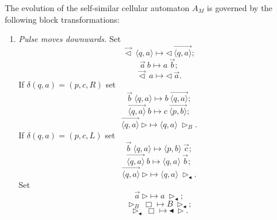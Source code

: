 \documentclass[pre,showpacs,showkeys,preprint]{revtex4}
\theoremstyle{definition}
\begin{document}
The evolution of the self-similar cellular automaton $A_M$ is governed by the following block transformations:
\begin{enumerate}

\item
\emph{Pulse moves downwards.}
Set
\begin{equation}
\overrightarrow{\lhd} \: \langle q, a \rangle \mapsto \lhd \:
\overrightarrow{\langle q, a \rangle};
\label{tr:start-state}
\end{equation}
\begin{equation}
\overrightarrow{a} \: b \mapsto a \: \overrightarrow{b};
\label{tr:down}
\end{equation}
\begin{equation}
\overrightarrow{\lhd} \:a \mapsto \lhd \: \overrightarrow{a}.
\label{tr:start}
\end{equation}
If $\delta(q,a) = (p,c,R)$ set
\begin{equation}
\overrightarrow{b} \: \langle q, a \rangle \mapsto b \:
\overrightarrow{\langle q, a \rangle};
\label{tr:down-to-head}
\end{equation}
\begin{equation}
\overrightarrow{\langle q,a \rangle} \: b \mapsto c \:
\overrightarrow{\langle p, b \rangle};
\label{tr:right-2}
\end{equation}
\begin{equation}
\overrightarrow{\langle q,a \rangle} \: \rhd \mapsto \langle q,a \rangle \:
\rhd_B.
\label{tr:down-state-right-delimiter-blank}
\end{equation}
If $\delta(q,a) = (p,c,L)$ set
\begin{equation}
\overrightarrow{b} \: \langle q, a \rangle \mapsto \langle p, b \rangle \:
\overrightarrow{c};
\label{tr:left-1}
\end{equation}
\begin{equation}
\overrightarrow{\langle q,a \rangle} \: b \mapsto \langle q,a \rangle \:
\overrightarrow{b};
\label{tr:left-no-move}
\end{equation}
\begin{equation}
\overrightarrow{\langle q,a \rangle} \: \rhd \mapsto \langle q,a \rangle \:
\rhd_\blacktriangleleft.
\label{tr:down-state-right-delimiter}
\end{equation}
Set
\begin{equation}
\overrightarrow{a} \: \rhd \mapsto a \: \rhd_\blacktriangleleft;
\label{tr:down-a-rhd}
\end{equation}
\begin{equation}
\rhd_B \: \Box \mapsto B \: \rhd_\blacktriangleleft;
\label{tr:new-blank}
\end{equation}
\begin{equation}
\rhd_\blacktriangleleft \: \Box \mapsto \blacktriangleleft \: \rhd.
\label{tr:reflection-right}
\end{equation}


\end{enumerate}
\end{document}
